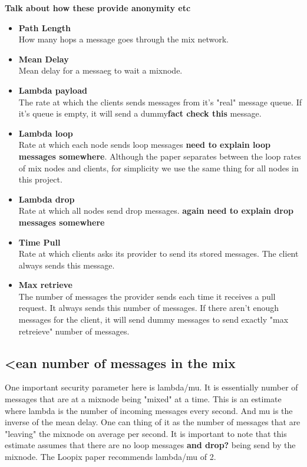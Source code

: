 \documentclass[a4paper,11pt,oneside]{report}
\begin{document}
\textbf{Talk about how these provide anonymity etc}
\begin{itemize}
\item \textbf{Path Length} \\
How many hops a message goes through the mix network.
\item \textbf{Mean Delay} \\
Mean delay for a messaeg to wait a mixnode.
\item \textbf{Lambda payload} \\
The rate at which the clients sends messages from it's "real" message queue. If it's queue is empty, it will send a dummy\textbf{fact check this} message.
\item \textbf{Lambda loop} \\ 
Rate at which each node sends loop messages \textbf{need to explain loop messages somewhere}. Although the paper separates between the loop rates of mix nodes and clients, for simplicity we use the same thing for all nodes in this project.
\item \textbf{Lambda drop} \\
Rate at which all nodes send drop messages. \textbf{again need to explain drop messages somewhere}
\item \textbf{Time Pull} \\
Rate at which clients asks its provider to send its stored messages. The client always sends this message.
\item \textbf{Max retrieve} \\
The number of messages the provider sends each time it receives a pull request. It always sends this number of messages. If there aren't enough messages for the client, it will send dummy messages to send exactly "max retreieve" number of messages.
\end{itemize}

\subsection{<ean number of messages in the mix}
One important security parameter here is lambda/mu. It is essentially number of messages that are at a mixnode being "mixed" at a time. This is an estimate where lambda is the number of incoming messages every second. And mu is the inverse of the mean delay. One can thing of it as the number of messages that are "leaving" the mixnode on average per second. It is important to note that this estimate assumes that there are no loop messages \textbf{and drop?} being send by the mixnode. The Loopix paper recommends lambda/mu of 2. 
\end{document}
